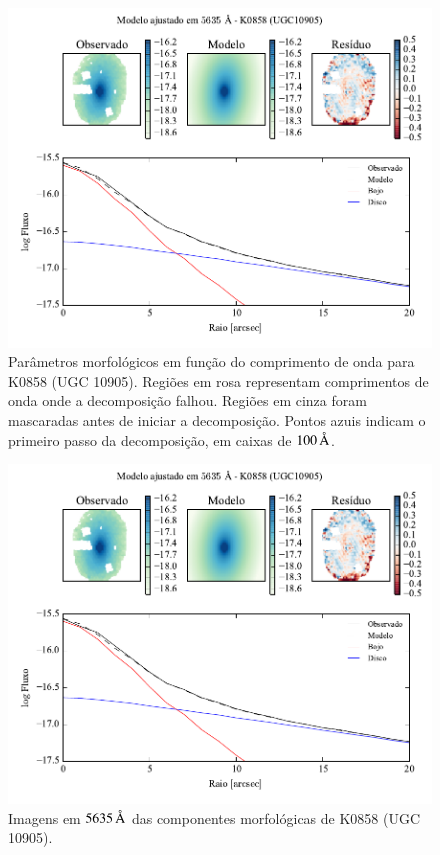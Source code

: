 \begin{figure}
	\includegraphics[page=2]{figuras-decomp/K0858_sample006a}
	\caption[Parâmetros morfológicos em função do comprimento de onda de K0858
	(UGC 10905)]
	{Parâmetros morfológicos em função do comprimento de onda para
	K0858 (UGC 10905). Regiões em rosa representam comprimentos de onda onde a
	decomposição falhou. Regiões em cinza foram mascaradas antes de iniciar a
	decomposição. Pontos azuis indicam o primeiro passo da decomposição, em caixas
	de $100\,\text{\normalfont\AA}$.}
	\label{fig:decompParams:K0858}
\end{figure}

\begin{figure}
	\includegraphics[page=3]{figuras-decomp/K0858_sample006a}
	\caption[Imagens em $5635\,\angstrom$ das componentes morfológicas de K0858
	(UGC 10905)]
	{Imagens em $5635\,\angstrom$ das componentes morfológicas de K0858
	(UGC 10905).}
	\label{fig:decompImages:K0858}
\end{figure}

